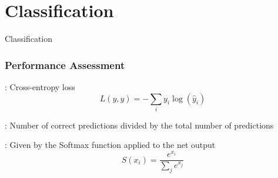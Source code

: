 \documentclass[../presentation.tex]{subfiles} %
\begin{document}
\section{Classification}

\begin{frame}
	\begin{cbox}
		{\fontsize{20pt}{7.2}\selectfont Classification}
	\end{cbox}
\end{frame}

\begin{frame}
    \frametitle{Performance Assessment}


		\begin{cbox}
			: Cross-entropy loss 
			\begin{equation*}
				L(y, \hat{y}) = -\sum_{i} y_i \log(\hat{y}_i)
			\end{equation*}
		\end{cbox}

		\begin{cbox}
			: Number of correct predictions divided by the total number of predictions
		\end{cbox}

		\begin{cbox}
			: Given by the Softmax function applied to the net output
			\begin{equation*}
				S(x_i) = \frac{e^{x_i}}{\sum_{j} e^{x_j}}
			\end{equation*}
		\end{cbox}

\end{frame}
\end{document}
